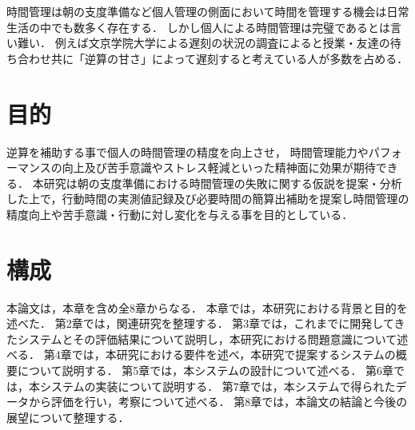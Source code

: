 時間管理は朝の支度準備など個人管理の側面において時間を管理する機会は日常生活の中でも数多く存在する．
しかし個人による時間管理は完璧であるとは言い難い．
例えば文京学院大学による遅刻の状況の調査によると授業・友達の待ち合わせ共に「逆算の甘さ」によって遅刻すると考えている人が多数を占める\cite{bunkyo}．

\section{目的}
逆算を補助する事で個人の時間管理の精度を向上させ，
時間管理能力やパフォーマンスの向上及び苦手意識やストレス軽減といった精神面に効果が期待できる．
本研究は朝の支度準備における時間管理の失敗に関する仮説を提案・分析した上で，行動時間の実測値記録及び必要時間の簡算出補助を提案し時間管理の精度向上や苦手意識・行動に対し変化を与える事を目的としている．

\section{構成}
本論文は，本章を含め全8章からなる．
本章では，本研究における背景と目的を述べた．
第2章では，関連研究を整理する．
第3章では，これまでに開発してきたシステムとその評価結果について説明し，本研究における問題意識について述べる．
第4章では，本研究における要件を述べ，本研究で提案するシステムの概要について説明する．
第5章では，本システムの設計について述べる．
第6章では，本システムの実装について説明する．
第7章では，本システムで得られたデータから評価を行い，考察について述べる．
第8章では，本論文の結論と今後の展望について整理する．